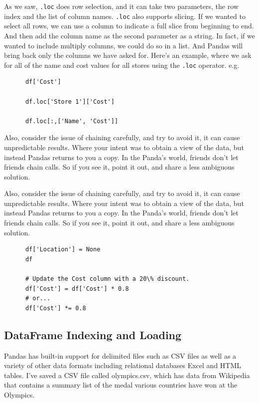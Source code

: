 \documentclass[11pt]{article}
\begin{document}
    As we saw, {\tt .loc} does row selection, and it can take two
    parameters, the row index and the list of column names. {\tt .loc} also
    supports slicing. If we wanted to select all rows, we can use a column
    to indicate a full slice from beginning to end. And then add the
    column name as the second parameter as a string. In fact, if we wanted
    to include multiply columns, we could do so in a list. And Pandas will
    bring back only the columns we have asked for. Here's an example,
    where we ask for all of the name and cost values for all stores using
    the {\tt .loc} operator. e.g.  
    \begin{lstlisting}
      df['Cost']
      
      df.loc['Store 1']['Cost']
      
      df.loc[:,['Name', 'Cost']]
    \end{lstlisting}
    Also, consider the issue of chaining carefully, and try to avoid
    it, it can cause unpredictable results. Where your intent was to
    obtain a view of the data, but instead Pandas returns to you a
    copy. In the Panda's world, friends don't let friends chain calls. So
    if you see it, point it out, and share a less ambiguous solution.

    Also, consider the issue of chaining carefully, and try to avoid
    it, it can cause unpredictable results. Where your intent was to
    obtain a view of the data, but instead Pandas returns to you a
    copy. In the Panda's world, friends don't let friends chain calls. So
    if you see it, point it out, and share a less ambiguous solution.
    \begin{lstlisting}
      df['Location'] = None
      df
      
      # Update the Cost column with a 20\% discount.
      df['Cost'] = df['Cost'] * 0.8   
      # or... 
      df['Cost'] *= 0.8
    \end{lstlisting}


    \subsection{DataFrame Indexing and Loading}
    \smallskip     \smallskip     \noindent
    Pandas has built-in support for delimited files such as CSV files
    as well as a variety of other data formats including relational
    databases Excel and HTML tables.  I've saved a CSV file called
    olympics.csv, which has data from Wikipedia that contains a summary
    list of the medal various countries have won at the Olympics.
    
\end{document}
